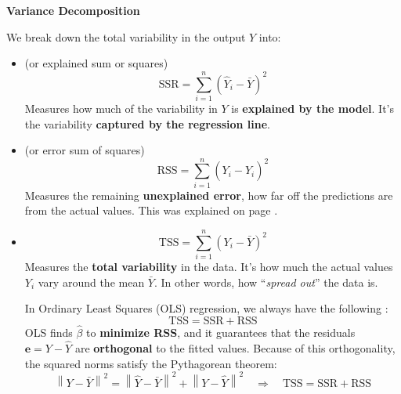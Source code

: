 \highspace
\begin{flushleft}
    \textcolor{Green3}{ \textbf{Variance Decomposition}}
\end{flushleft}
We break down the total variability in the output $Y$ into:
\begin{itemize}
    \item {} (or explained sum or squares)
    \begin{equation}
        \text{SSR} = \displaystyle\sum_{i=1}^{n}\left(\hat{Y}_{i} - \bar{Y}\right)^{2}
    \end{equation}
    Measures how much of the variability in $Y$ is \textbf{explained by the model}. It's the variability \textbf{captured by the regression line}.
    
    
    \item {} (or error sum of squares)
    \begin{equation*}
        \text{RSS} = \displaystyle\sum_{i=1}^{n} \left(Y_i - \hat{Y}_i\right)^{2}
    \end{equation*}
    Measures the remaining \textbf{unexplained error}, how far off the predictions are from the actual values. This was explained on page \pageref{eq: RSS}.
    
    
    \item {}
    \begin{equation}
        \text{TSS} = \displaystyle\sum_{i=1}^{n}\left(Y_{i} - \bar{Y}\right)^{2}
    \end{equation}
    Measures the \textbf{total variability} in the data. It's how much the actual values $Y_i$ vary around the mean $\bar{Y}$. In other words, how ``\emph{spread out}'' the data is.

    In Ordinary Least Squares (OLS) regression, we always have the following :
    \begin{equation}
        \text{TSS} = \text{SSR} + \text{RSS}
    \end{equation}
    OLS finds $\hat{\beta}$ to \textbf{minimize RSS}, and it guarantees that the residuals\break $\mathbf{e} = Y - \hat{Y}$ are \textbf{orthogonal} to the fitted values. Because of this orthogonality, the squared norms satisfy the Pythagorean theorem:
    \begin{equation*}
        \left\| Y - \bar{Y} \right\|^{2} = \left\| \hat{Y} - \bar{Y} \right\|^{2} + \left\| Y - \hat{Y} \right\|^{2} \quad \Rightarrow \quad \text{TSS} = \text{SSR} + \text{RSS}
    \end{equation*}
\end{itemize}

